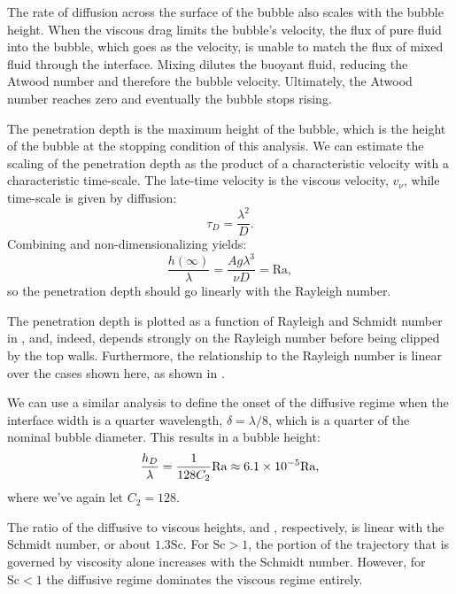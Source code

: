 The rate of diffusion across the surface of the bubble also scales with the bubble height.
When the viscous drag limits the bubble's velocity, the flux of pure fluid into the bubble, which goes as the velocity, is unable to match the flux of mixed fluid through the interface.
Mixing dilutes the buoyant fluid, reducing the Atwood number and therefore the bubble velocity.
Ultimately, the Atwood number reaches zero and eventually the bubble stops rising.

The penetration depth is the maximum height of the bubble, which is the height of the bubble at the stopping condition of this analysis.
We can estimate the scaling of the penetration depth as the product of a characteristic velocity with a characteristic time-scale.
The late-time velocity is the viscous velocity, $v_\nu$, while time-scale is given by diffusion:
\begin{equation}
\tau_D = \frac{\lambda^2}{D}.
\end{equation}
Combining and non-dimensionalizing yields:
\begin{equation}
\frac{h(\infty)}{\lambda} = \frac{A g \lambda^3}{\nu D} = \text{Ra},
\end{equation}
so the penetration depth should go linearly with the Rayleigh number.

The penetration depth is plotted as a function of Rayleigh and Schmidt number in , and, indeed, depends strongly on the Rayleigh number before being clipped by the top walls.
Furthermore, the relationship to the Rayleigh number is linear over the cases shown here, as shown in .

We can use a similar analysis to define the onset of the diffusive regime when the interface width is a quarter wavelength, $\delta = \lambda / 8$, which is a quarter of the nominal bubble diameter.
This results in a bubble height:
\begin{equation} \elabel{diff_height}
\frac{h_D}{\lambda} = \frac{1}{128 C_2} \text{Ra} \approx 6.1 \times 10^{-5} \text{Ra},
\end{equation}
where we've again let $C_2 = 128$.

The ratio of the diffusive to viscous heights,  and , respectively, is linear with the Schmidt number, or about $1.3 \text{Sc}$.
For $\text{Sc} > 1$, the portion of the trajectory that is governed by viscosity alone increases with the Schmidt number.
However, for $\text{Sc} < 1$ the diffusive regime dominates the viscous regime entirely.


